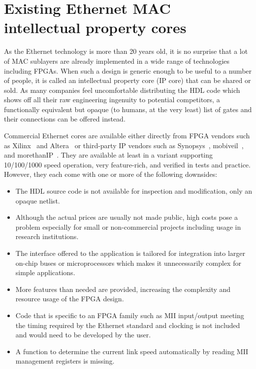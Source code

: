\documentclass[a4paper, 11pt, oneside]{Thesis}  %
\begin{document}
\section{Existing Ethernet MAC intellectual property cores}\label{ch:exist_cores}

As the Ethernet technology is more than 20 years old, it is no surprise that a lot of MAC sublayers are already implemented in a wide range of technologies including FPGAs. When such a design is generic enough to be useful to a number of people, it is called an intellectual property core (IP core) that can be shared or sold. As many companies feel uncomfortable distributing the HDL code which shows off all their raw engineering ingenuity to potential competitors, a functionally equivalent but opaque (to humans, at the very least) list of gates and their connections can be offered instead.

Commercial Ethernet cores are available either directly from FPGA vendors such as Xilinx~\cite{MAC_xilinx} and Altera~\cite{MAC_altera} or third-party IP vendors such as Synopsys~\cite{MAC_synopsys}, mobiveil~\cite{MAC_mobiveil}, and morethanIP~\cite{MAC_morethanip}. They are available at least in a variant supporting 10/100/1000 speed operation, very feature-rich, and verified in tests and practice. However, they each come with one or more of the following downsides:

\begin{itemize}
\item The HDL source code is not available for inspection and modification, only an opaque netlist.
\item Although the actual prices are usually not made public, high costs pose a problem especially for small or non-commercial projects including usage in research institutions.
\item The interface offered to the application is tailored for integration into larger on-chip buses or microprocessors which makes it unnecessarily complex for simple applications.
\item More features than needed are provided, increasing the complexity and resource usage of the FPGA design.
\item Code that is specific to an FPGA family such as MII input/output meeting the timing required by the Ethernet standard and clocking is not included and would need to be developed by the user.
\item A function to determine the current link speed automatically by reading MII management registers is missing.
\end{itemize}
\end{document}
